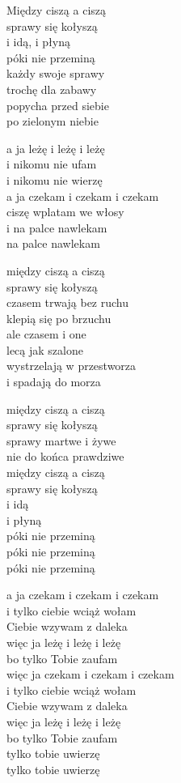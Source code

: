 \begin{text}
    \begin{footTwelve}
    Między ciszą a ciszą\\
    sprawy się kołyszą\\
    i idą, i płyną\\
    póki nie przeminą\\
    \vin każdy swoje sprawy\\
    \vin trochę dla zabawy\\
    \vin popycha przed siebie\\
    \vin po zielonym niebie

    a ja leżę i leżę i leżę\\
    i nikomu nie ufam\\
    i nikomu nie wierzę\\
    a ja czekam i czekam i czekam\\
    ciszę wplatam we włosy\\
    i na palce nawlekam\\
    na palce nawlekam

    między ciszą a ciszą\\
    sprawy się kołyszą\\
    czasem trwają bez ruchu\\
    klepią się po brzuchu\\
    \vin ale czasem i one\\
    \vin lecą jak szalone\\
    \vin wystrzelają w przestworza\\
    \vin i spadają do morza

    między ciszą a ciszą\\
    sprawy się kołyszą\\
    sprawy martwe i żywe\\
    nie do końca prawdziwe\\
    między ciszą a ciszą\\
    sprawy się kołyszą\\
    i idą\\
    i płyną\\
    póki nie przeminą\\
    póki nie przeminą\\
    póki nie przeminą

    a ja czekam i czekam i czekam\\
    i tylko ciebie wciąż wołam\\
    Ciebie wzywam z daleka\\
    więc ja leżę i leżę i leżę\\
    bo tylko Tobie zaufam\\
    więc ja czekam i czekam i czekam\\
    i tylko ciebie wciąż wołam\\
    Ciebie wzywam z daleka\\
    więc ja leżę i leżę i leżę\\
    bo tylko Tobie zaufam\\
    tylko tobie uwierzę\\
    tylko tobie uwierzę
\end{footTwelve}
\end{text}
